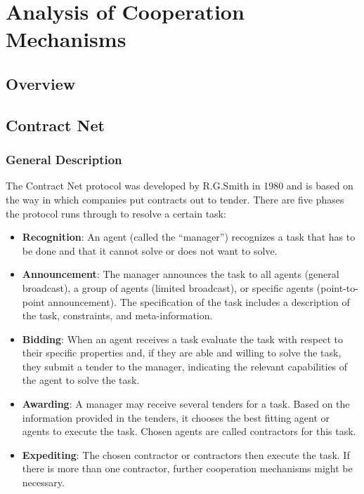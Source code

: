 \section{Analysis of Cooperation Mechanisms}

\subsection{Overview}

\subsection{Contract Net}

\subsubsection*{General Description}

The Contract Net protocol was developed by R.G.Smith in 1980 \cite{Smith:1980:CNP:1311969.1312903} and is based on the way in which companies put contracts out to tender. There are five phases the protocol runs through to resolve a certain task:

\begin{itemize}
	\item \textbf{Recognition}: An agent (called the ``manager'') recognizes a task that has to be done and that it cannot solve or does not want to solve.	
	\item \textbf{Announcement}: The manager announces the task to all agents (general broadcast), a group of agents (limited broadcast), or specific agents (point-to-point announcement). The specification of the task includes a description of the task, constraints, and meta-information.
	\item \textbf{Bidding}: When an agent receives a task evaluate the task with respect to their specific properties and, if they are able and willing to solve the task, they submit a tender to the manager, indicating the relevant capabilities of the agent to solve the task.
	\item \textbf{Awarding}: A manager may receive several tenders for a task. Based on the information provided in the tenders, it chooses the best fitting agent or agents to execute the task. Chosen agents are called contractors for this task.
	\item \textbf{Expediting}: The chosen contractor or contractors then execute the task. If there is more than one contractor, further cooperation mechanisms might be necessary.
\end{itemize}

